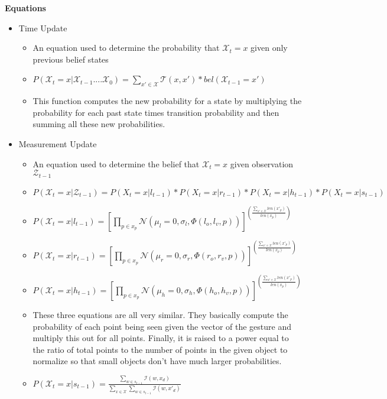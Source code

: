 \documentclass[letterpaper, 10 pt, conference]{ieeeconf}
\begin{document}
\textbf{Equations}
\begin{itemize}
\item{Time Update}
	\begin{itemize}
	\item{An equation used to determine the probability that $\mathcal{X}_t = x$ given only previous belief states}
	\item{$P(\mathcal{X}_t = x | \mathcal{X}_{t-1} .... \mathcal{X}_0) =\displaystyle\sum_{x' \in \mathcal{X}} \mathcal{T}(x, x')*bel(\mathcal{X}_{t-1} = x')$}
	\item{This function computes the new probability for a state by multiplying the probability for each past state times  transition probability and then summing all these new probabilities.}
	\end{itemize}
\item{Measurement Update}
	\begin{itemize}
	\item{An equation used to determine the belief that $\mathcal{X}_t = x$ given observation $\mathcal{Z}_{t-1}$}
	\item{$P(\mathcal{X}_t=x | \mathcal{Z}_{t-1}) = P(X_t=x | l_{t-1})*P(X_t=x | r_{t-1})*P(X_t=x |h_{t-1})*P(X_t=x | s_{t-1})$}
	\item{$P(\mathcal{X}_t=x|l_{t-1}) = [\displaystyle \prod_{p \in x_p} \mathcal{N}(\mu_l=0, \sigma_l, \Phi(l_o,l_v, p))]^{(\frac{\sum_{x'\in\mathcal{X}} len(x'_p)}{len(x_p)})}$\\}
	\item{$P(\mathcal{X}_t=x|r_{t-1}) = [\displaystyle \prod_{p \in x_p} \mathcal{N}(\mu_r=0, \sigma_r, \Phi(r_o,r_v, p))]^{(\frac{\sum_{x'\in\mathcal{X}} len(x'_p)}{len(x_p)})}$\\}
	\item{$P(\mathcal{X}_t=x|h_{t-1}) = [\displaystyle \prod_{p \in x_p} \mathcal{N}(\mu_h=0, \sigma_h, \Phi(h_o,h_v, p))]^{(\frac{\sum_{x'\in\mathcal{X}} len(x'_p)}{len(x_p)})}$\\}
	\item{These three equations are all very similar. They basically compute the probability of each point being seen given the vector of the gesture and multiply this out for all points. Finally, it is raised to a power equal to the ratio of total points to the number of points in the given object to normalize so that small objects don't have much larger probabilities.}
	\item{$P(\mathcal{X}_t=x|s_{t-1}) = \frac{\displaystyle\sum_{w\in s_{t-1}} \mathcal{I}(w, x_d)}{\displaystyle\sum_{x \in \mathcal{X}}\sum_{w\in s_{t-1}} \mathcal{I}(w, x'_d)}$}

\end{itemize}
\end{itemize}
\end{document}
